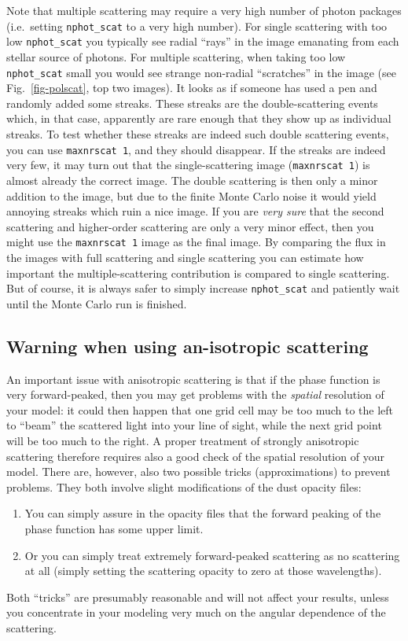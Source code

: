 \documentclass{report}
\begin{document}
Note that multiple scattering may require a very high number of photon
packages (i.e.~setting {\small\tt nphot\_scat} to a very high number). For
single scattering with too low {\small\tt nphot\_scat} you typically see
radial ``rays'' in the image emanating from each stellar source of
photons. For multiple scattering, when taking too low {\small\tt
  nphot\_scat} small you would see strange non-radial ``scratches'' in the
image (see Fig.~\ref{fig-polscat}, top two images). It looks as if someone
has used a pen and randomly added some streaks. These streaks are the
double-scattering events which, in that case, apparently are rare enough
that they show up as individual streaks. To test whether these streaks are
indeed such double scattering events, you can use {\small\tt maxnrscat 1},
and they should disappear. If the streaks are indeed very few, it may turn
out that the single-scattering image ({\small\tt maxnrscat 1}) is almost
already the correct image. The double scattering is then only a minor
addition to the image, but due to the finite Monte Carlo noise it would
yield annoying streaks which ruin a nice image. If you are {\em very sure}
that the second scattering and higher-order scattering are only a very minor
effect, then you might use the {\small\tt maxnrscat 1} image as the final
image. By comparing the flux in the images with full scattering and single
scattering you can estimate how important the multiple-scattering
contribution is compared to single scattering. But of course, it is always
safer to simply increase {\small\tt nphot\_scat} and patiently wait until
the Monte Carlo run is finished.


\subsection{Warning when using an-isotropic scattering}
An important issue with anisotropic scattering is that if the phase function
is very forward-peaked, then you may get problems with the {\em spatial}
resolution of your model: it could then happen that one grid cell may be too
much to the left to ``beam'' the scattered light into your line of sight,
while the next grid point will be too much to the right. A proper treatment
of strongly anisotropic scattering therefore requires also a good check of
the spatial resolution of your model. There are, however, also two possible
tricks (approximations) to prevent problems. They both involve slight modifications of
the dust opacity files:
\begin{enumerate}
\item You can simply assure in the opacity files that the forward peaking of
  the phase function has some upper limit.
\item Or you can simply treat extremely forward-peaked scattering as no
  scattering at all (simply setting the scattering opacity to zero at those
  wavelengths). 
\end{enumerate}
Both ``tricks'' are presumably reasonable and will not affect your results,
unless you concentrate in your modeling very much on the angular dependence
of the scattering.
\end{document}
